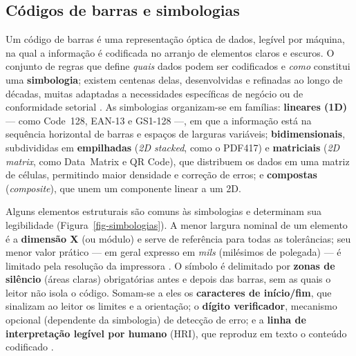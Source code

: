 \documentclass[
	article,			%
	11pt,				%
	oneside,			%
	a4paper,			%
	english,			%
	brazilian,			%
	sumario=tradicional
	]{abntex2}
\begin{document}
\subsection{Códigos de barras e simbologias}

Um código de barras é uma representação óptica de dados, legível por máquina, na
qual a informação é codificada no arranjo de elementos claros e escuros. O conjunto
de regras que define \emph{quais} dados podem ser codificados e \emph{como}
constitui uma \textbf{simbologia}; existem centenas delas, desenvolvidas e refinadas
ao longo de décadas, muitas adaptadas a necessidades específicas de negócio ou de
conformidade setorial \cite{seagull}. As simbologias organizam-se em famílias:
\textbf{lineares (1D)} --- como Code~128, EAN-13 e GS1-128 ---, em que a informação
está na sequência horizontal de barras e espaços de larguras variáveis;
\textbf{bidimensionais}, subdivididas em \textbf{empilhadas} (\textit{2D stacked},
como o PDF417) e \textbf{matriciais} (\textit{2D matrix}, como Data~Matrix e QR
Code), que distribuem os dados em uma matriz de células, permitindo maior densidade
e correção de erros; e \textbf{compostas} (\textit{composite}), que unem um
componente linear a um 2D.

Alguns elementos estruturais são comuns às simbologias e determinam sua
legibilidade (Figura~\ref{fig-simbologias}). A menor largura nominal de um elemento
é a \textbf{dimensão X} (ou módulo) e serve de referência para todas as tolerâncias;
seu menor valor prático --- em geral expresso em \textit{mils} (milésimos de
polegada) --- é limitado pela resolução da impressora \cite{seagull}. O símbolo é
delimitado por \textbf{zonas de silêncio} (áreas claras) obrigatórias antes e depois
das barras, sem as quais o leitor não isola o código. Somam-se a eles os
\textbf{caracteres de início/fim}, que sinalizam ao leitor os limites e a orientação;
o \textbf{dígito verificador}, mecanismo opcional (dependente da simbologia) de
detecção de erro; e a \textbf{linha de interpretação legível por humano} (HRI), que
reproduz em texto o conteúdo codificado \cite{seagull}.
\end{document}
